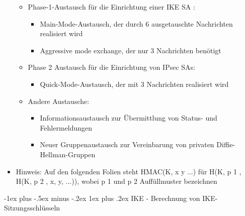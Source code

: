 \documentclass[a4paper]{article}
\makeatletter
\renewcommand{\subsubsection}{\@startsection{subsubsection}{3}{0mm}%
 {-1ex plus -.5ex minus -.2ex}%
 {1ex plus .2ex}%
 {\normalfont\small\bfseries}}
\makeatother
\begin{document}
\begin{multicols}{3}
\begin{itemize}
              \begin{itemize}
                  \item
                        Phase-1-Austausch für die Einrichtung einer IKE SA :

                        \begin{itemize}
                            \item
                                  Main-Mode-Austausch, der durch 6 ausgetauschte Nachrichten
                                  realisiert wird
                            \item
                                  Aggressive mode exchange, der nur 3 Nachrichten benötigt
                        \end{itemize}
                  \item
                        Phase 2 Austausch für die Einrichtung von IPsec SAs:

                        \begin{itemize}
                            \item
                                  Quick-Mode-Austausch, der mit 3 Nachrichten realisiert wird
                        \end{itemize}
                  \item
                        Andere Austausche:

                        \begin{itemize}
                            \item
                                  Informationsaustausch zur Übermittlung von Status- und
                                  Fehlermeldungen
                            \item
                                  Neuer Gruppenaustausch zur Vereinbarung von privaten
                                  Diffie-Hellman-Gruppen
                        \end{itemize}
              \end{itemize}
        \item
              Hinweis: Auf den folgenden Folien steht HMAC(K, x \textbar{} y
              \textbar{} ...) für H(K, p 1 , H(K, p 2 , x, y, ...)), wobei p 1 und p
              2 Auffüllmuster bezeichnen
    \end{itemize}


    \subsubsection{IKE - Berechnung von
        IKE-Sitzungsschlüsseln}


\end{multicols}
\end{document}
